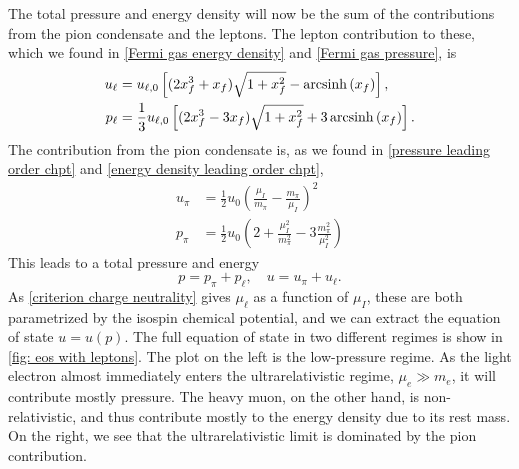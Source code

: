 The total pressure and energy density will now be the sum of the contributions from the pion condensate and the leptons.
The lepton contribution to these, which we found in \autoref{Fermi gas energy density} and \autoref{Fermi gas pressure}, is
%
\begin{align}
    u_\ell 
    &= u_{\ell,0} 
    \left[(2x_f^3 + x_f) \sqrt{1 + x_f^2} - \operatorname{arcsinh}\left(x_f\right)\right], \\
    p_\ell
    &=\frac{1}{3} u_{\ell,0}
    \left[(2x_f^3 - 3x_f) \sqrt{1 + x_f^2} + 3\operatorname{arcsinh}\left(x_f\right)\right].
\end{align}
%
The contribution from the pion condensate is, as we found in \autoref{pressure leading order chpt} and \autoref{energy density leading order chpt},
%
\begin{align}
    u_\pi &= \frac{1}{2} u_0 \left( \frac{\mu_I}{m_\pi} - \frac{m_\pi}{\mu_I}\right)^2 \\
    p_\pi &= \frac{1}{2} u_0 \left( 2 + \frac{\mu_I^2}{m_\pi^2} - 3 \frac{m_\pi^2}{\mu_I^2}  \right)
\end{align}
%
This leads to a total pressure and energy
%
\begin{equation}
    p = p_\pi + p_\ell, \quad u = u_\pi + u_\ell.
\end{equation}
%
As \autoref{criterion charge neutrality} gives $\mu_\ell$ as a function of $\mu_I$, these are both parametrized by the isospin chemical potential, and we can extract the equation of state $u = u(p)$.
The full equation of state in two different regimes is show in \autoref{fig: eos with leptons}.
The plot on the left is the low-pressure regime.
As the light electron almost immediately enters the ultrarelativistic regime, $\mu_e\gg m_e$, it will contribute mostly pressure.
The heavy muon, on the other hand, is non-relativistic, and thus contribute mostly to the energy density due to its rest mass.
On the right, we see that the ultrarelativistic limit is dominated by the pion contribution.


